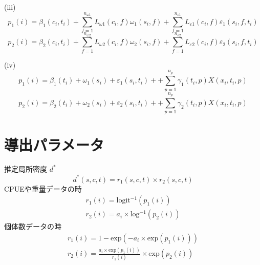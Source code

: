 \documentclass[11pt]{article}
\begin{document}
\hspace{1.2cm} (iii)
\begin{dmath}
  p_1(i) = \beta_{1}(c_{i}, t_{i}) + \sum_{f = 1}^{n_{\omega 1}} L_{\omega 1}(c_i, f) \omega_1(s_i, f) + \sum_{f = 1}^{n_{\varepsilon1}}L_{\varepsilon1}(c_i,f)\varepsilon_1(s_i,f,t_i)
\end{dmath}
\begin{dmath}
  p_2(i) = \beta_{2}(c_{i}, t_{i}) + \sum_{f = 1}^{n_{\omega 2}} L_{\omega 2}(c_i, f) \omega_2(s_i, f) + \sum_{f = 1}^{n_{\varepsilon2}}L_{\varepsilon2}(c_i,f)\varepsilon_2(s_i,f,t_i)
\end{dmath}
\hspace*{2cm}\dotfill

\hspace{1.2cm} (iv)
\begin{dmath}
  p_1(i) = \beta_{1}(t_{i}) + \omega_1(s_i) + \varepsilon_1(s_i,t_i) + +\sum_{p = 1}^{n_p}\gamma_1(t_i,p)X(x_i,t_i,p)
\end{dmath}
\begin{dmath}
  p_2(i) = \beta_{2}(t_{i}) + \omega_2(s_i) + \varepsilon_2(s_i,t_i) + +\sum_{p = 1}^{n_p}\gamma_2(t_i,p)X(x_i,t_i,p)
\end{dmath}

\newpage
{\huge{\section*{導出パラメータ}}}
推定局所密度 $d^*$
\begin{dmath}
d^*(s,c,t) = r_{1}(s,c,t) \times r_{2}(s,c,t)
\end{dmath}
\hspace{1.5cm}CPUEや重量データの時
\begin{eqnarray}
r_{1}(i) = \mathrm{logit^{-1}}(p_{1}(i)) \nonumber \\
r_{2}(i) = a_i \times \mathrm{log^{-1}}(p_{2}(i))
\end{eqnarray}
\hspace{1.5cm}個体数データの時
\begin{eqnarray}
r_{1}(i) = 1 - \mathrm{exp}(-a_i \times \mathrm{exp}(p_{1}(i))) \nonumber \\
r_{2}(i) = \frac{a_{i} \times \mathrm{exp}(p_{1}(i))} {r_{1}(i)} \times \mathrm{exp}(p_{2}(i))
\end{eqnarray}
\hrulefill
\end{document}
